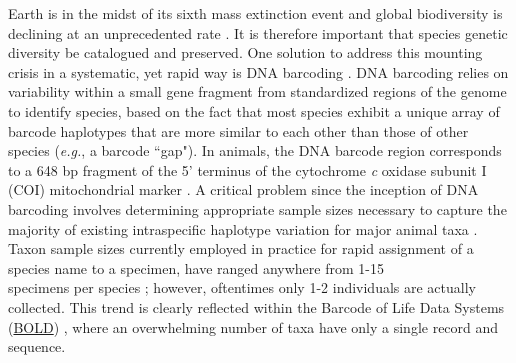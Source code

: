 Earth is in the midst of its sixth mass extinction event and global biodiversity is \\ declining at an unprecedented rate \cite{ceballos2015accelerated}. It is therefore important that species genetic diversity be catalogued and preserved. One solution to address this mounting crisis in a systematic, yet rapid way is DNA barcoding \cite{hebert2003biological}. DNA barcoding relies on variability within a small gene fragment from standardized regions of the genome to identify species, based on the fact that most species exhibit a unique array of barcode haplotypes that are more similar to each other than those of other species (\textit{e.g.}, a barcode ``gap"). In animals, the DNA barcode region corresponds to a 648 bp fragment of the 5' terminus of the cytochrome \textit{c} oxidase subunit I (COI) mitochondrial marker \cite{hebert2003biological, hebert2003barcoding}. A critical problem since the inception of DNA barcoding involves determining appropriate sample sizes necessary to capture the majority of existing intraspecific haplotype variation for major animal taxa \cite{hebert2004identification, meyer2005dna, ward2005dna}. Taxon sample sizes currently employed in practice for rapid assignment of a species name to a specimen, have ranged anywhere from 1-15 \\ specimens per species \cite{goodall2012comparison, jin2012simple, matz2005likelihood, ross2008testing, yao2017evaluating}; however, oftentimes only 1-2 individuals are actually collected. This trend is clearly reflected within the Barcode of Life Data Systems (\href{http://www.boldsystems.org}{BOLD}) \cite{ratnasingham2007bold}, where an overwhelming number of taxa have only a single record and sequence. 

